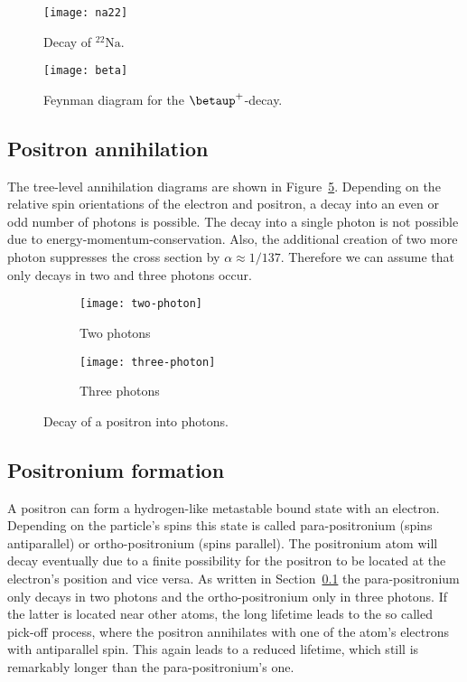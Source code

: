 \documentclass[11pt, english, fleqn, DIV=15, headinclude, BCOR=2cm]{scrreprt}
\begin{document}
\begin{figure}
    \centering
    \texttt{[image: na22]}
    \caption{%
        Decay of $\mathrm{^{22}Na}$.
    }
    \label{fig:na22}
\end{figure}

\begin{figure}
    \centering
    \texttt{[image: beta]}
    \caption{%
        Feynman diagram for the $\betaup^+$-decay.
    }
    \label{fig:beta}
\end{figure}

\subsection{Positron annihilation}
\label{ssec:pos_ann}

The tree-level annihilation diagrams are shown in
Figure~\ref{fig:annihilation}. Depending on the relative spin orientations of
the electron and positron, a decay into an even or odd number of photons is
possible. The decay into a single photon is not possible due to
energy-momentum-conservation. Also, the additional creation of two more photon
suppresses the cross section by $\alpha \approx 1/137$. Therefore we can assume
that only decays in two and three photons occur.

\begin{figure}
    \centering
    \begin{subfigure}[c]{0.48\linewidth}
        \centering
        \texttt{[image: two-photon]}
        \caption{%
            Two photons
        }
        \label{fig:/1}
    \end{subfigure}
    \hfill
    \begin{subfigure}[c]{0.48\linewidth}
        \centering
        \texttt{[image: three-photon]}
        \caption{%
            Three photons
        }
        \label{fig:/2}
    \end{subfigure}
    \caption{%
        Decay of a positron into photons.
    }
    \label{fig:annihilation}
\end{figure}

\subsection{Positronium formation}

A positron can form a hydrogen-like metastable bound state with an electron.
Depending on the particle's spins this state is called para-positronium (spins
antiparallel) or ortho-positronium (spins parallel). The positronium atom will
decay eventually due to a finite possibility for the positron to be located at
the electron's position and vice versa. As written in
Section~\ref{ssec:pos_ann} the para-positronium only decays in two photons and
the ortho-positronium only in three photons. If the latter is located near
other atoms, the long lifetime leads to the so called pick-off process, where
the positron annihilates with one of the atom's electrons with antiparallel
spin. This again leads to a reduced lifetime, which still is remarkably longer
than the para-positronium's one.
\end{document}
